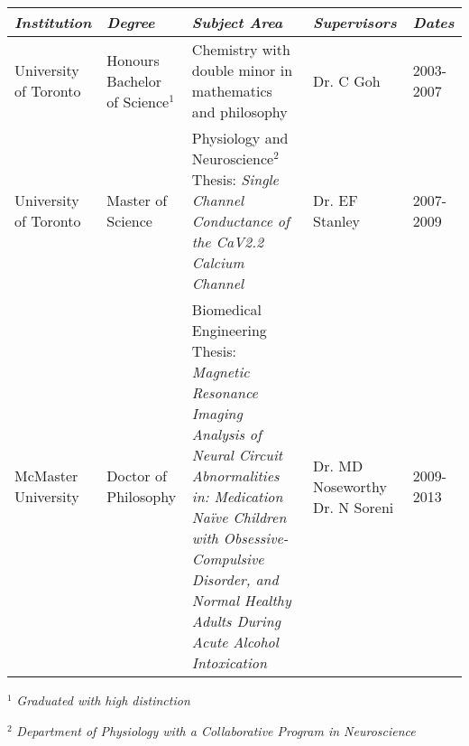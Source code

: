 \documentclass[11pt,notitlepage,english]{report}
\begin{document}

\begin{table}[h]
  \label{5. Post Sec Education}
  \begin{tabularx}{1\textwidth}{|p{2cm}|p{2cm}|p{8cm}|p{2.3cm}|X|}
    \hline
    \textit{Institution}  & \textit{Degree}                   & \textit{Subject Area}                                                                                                                                                                                                                                           & \textit{Supervisors}                        & \textit{Dates} \\
    \hline
    University of Toronto & Honours Bachelor of Science$^{1}$ & \raggedright Chemistry with double minor in mathematics and philosophy                                                                                                                                                                                          & Dr. C Goh                                   & 2003-2007      \\
    \hline
    University of Toronto & \raggedright Master of Science    & \raggedright Physiology and Neuroscience$^{2}$ \newline Thesis: \textit{Single Channel Conductance of the CaV2.2 Calcium Channel}                                                                                                                               & \raggedright Dr. EF Stanley                 & 2007-2009      \\
    \hline
    McMaster University   & \raggedright Doctor of Philosophy & \raggedright
    Biomedical Engineering \newline Thesis: \textit{Magnetic Resonance Imaging
  Analysis of Neural Circuit Abnormalities in: Medication Naïve Children with
  Obsessive-Compulsive Disorder, and Normal Healthy Adults During Acute Alcohol
  Intoxication} & \raggedright Dr. MD Noseworthy Dr. N Soreni & 2009-2013
  \\
    \hline
  \end{tabularx}
\end{table}
\vspace{-8pt}

$^{1}$ \textit{Graduated with high distinction}

$^{2}$ \textit{Department of Physiology with a Collaborative Program in Neuroscience}

\vspace{5pt}
\end{document}
